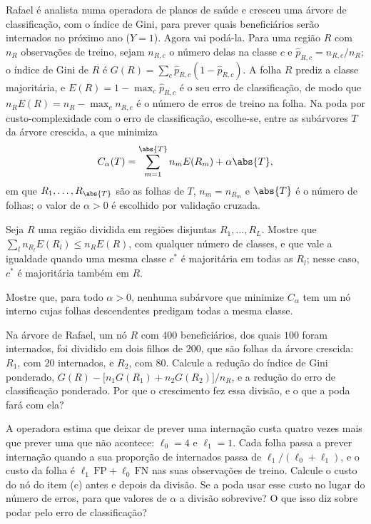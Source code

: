 Rafael é analista numa operadora de planos de saúde e cresceu uma árvore de classificação,
com o índice de Gini, para prever quais beneficiários serão internados no próximo ano
($Y=1$). Agora vai podá-la. Para uma região $R$ com $n_R$ observações de treino, sejam
$n_{R,c}$ o número delas na classe $c$ e $\widehat p_{R,c}=n_{R,c}/n_R$; o índice de Gini de
$R$ é $G(R)=\sum_c\widehat p_{R,c}(1-\widehat p_{R,c})$. A folha $R$ prediz a classe
majoritária, e $E(R)=1-\max_c\widehat p_{R,c}$ é o seu erro de classificação, de modo
que $n_RE(R)=n_R-\max_cn_{R,c}$ é o número de erros de treino na folha. Na poda por
custo-complexidade com o erro de classificação, escolhe-se, entre as subárvores $T$ da árvore
crescida, a que minimiza
\[
  C_\alpha(T)=\sum_{m=1}^{\abs{T}}n_mE(R_m)+\alpha\abs{T},
\]
em que $R_1,\dots,R_{\abs{T}}$ são as folhas de $T$, $n_m=n_{R_m}$ e $\abs{T}$ é o número de
folhas; o valor de $\alpha>0$ é escolhido por validação cruzada.
\begin{itens}
  \item {} Seja $R$ uma região dividida em regiões disjuntas $R_1,\dots,R_L$. Mostre
        que $\sum_ln_{R_l}E(R_l)\le n_RE(R)$, com qualquer número de classes, e que vale a
        igualdade quando uma mesma classe $c^*$ é majoritária em todas as $R_l$; nesse caso,
        $c^*$ é majoritária também em $R$.
  \item {} Mostre que, para todo $\alpha>0$, nenhuma subárvore que minimize $C_\alpha$
        tem um nó interno cujas folhas descendentes predigam todas a mesma classe.
  \item {} Na árvore de Rafael, um nó $R$ com $400$ beneficiários, dos quais $100$
        foram internados, foi dividido em dois filhos de $200$, que são folhas da árvore
        crescida: $R_1$, com $20$ internados, e $R_2$, com $80$. Calcule a redução do índice
        de Gini ponderado,
        $G(R)-\big[n_1G(R_1)+n_2G(R_2)\big]/n_R$, e a redução do erro de classificação
        ponderado. Por que o crescimento fez essa divisão, e o que a poda fará com ela?
  \item {} A operadora estima que deixar de prever uma internação custa quatro vezes
        mais que prever uma que não acontece: $\ell_0=4$ e $\ell_1=1$. Cada folha passa a
        prever internação quando a sua proporção de internados passa de
        $\ell_1/(\ell_0+\ell_1)$, e o custo da folha é $\ell_1\,\mathrm{FP}+\ell_0\,\mathrm{FN}$
        nas suas observações de treino. Calcule o custo do nó do item (c) antes e depois da
        divisão. Se a poda usar esse custo no lugar do número de erros, para que valores de
        $\alpha$ a divisão sobrevive? O que isso diz sobre podar pelo erro de classificação?
\end{itens}

